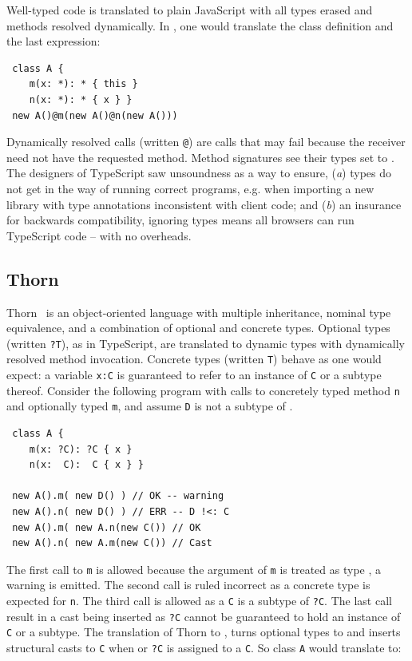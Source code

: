 \documentclass[a4paper,USenglish]{tex/lipics-v2016}
\newcommand{\code}[1]{{\tt #1}\xspace}
\begin{document}
\noindent
Well-typed code is translated to plain JavaScript with all types erased and
methods resolved dynamically. In \kafka, one would translate the class
definition and the last expression:

\begin{lstlisting}
 class A { 
    m(x: *): * { this }
    n(x: *): * { x } }
 new A()@m(new A()@n(new A()))    
\end{lstlisting}

\noindent
Dynamically resolved calls (written \code @) are calls that may fail because
the receiver need not have the requested method. Method signatures see their
types set to \any.  The designers of TypeScript saw unsoundness as a way to
ensure, ({\em a}) types do not get in the way of running correct programs,
e.g. when importing a new library with type annotations inconsistent with
client code; and ({\em b}) an insurance for backwards compatibility,
ignoring types means all browsers can run TypeScript code -- with no
overheads.

\subsection{Thorn}

Thorn~\cite{oopsla09} is an object-oriented language with multiple
inheritance, nominal type equivalence, and a combination of optional and
concrete types. Optional types (written \code{?T}), as in TypeScript, are
translated to dynamic types with dynamically resolved method
invocation. Concrete types (written \code{T}) behave as one would expect: a
variable \code{x:C} is guaranteed to refer to an instance of \code C or a
subtype thereof. Consider the following program with calls to concretely
typed method \code n and optionally typed \code m, and assume \code D is not
a subtype of \C.

\begin{lstlisting}
 class A {
    m(x: ?C): ?C { x }
    n(x:  C):  C { x } }

 new A().m( new D() ) // OK -- warning
 new A().n( new D() ) // ERR -- D !<: C
 new A().m( new A.n(new C()) // OK
 new A().n( new A.m(new C()) // Cast
\end{lstlisting}

\noindent
The first call to \code m is allowed because the argument of \code m is
treated as type \any, a warning is emitted. The second call is ruled
incorrect as a concrete type is expected for \code n. The third call is
allowed as a \code C is a subtype of \code{?C}. The last call result in a
cast being inserted as \code{?C} cannot be guaranteed to hold an instance of
\code{C} or a subtype.  The translation of Thorn to \kafka, turns optional
types to \any and inserts structural casts to \code{C} when \any or
\code{?C} is assigned to a \code{C}. So class \code A would translate to:
\end{document}
